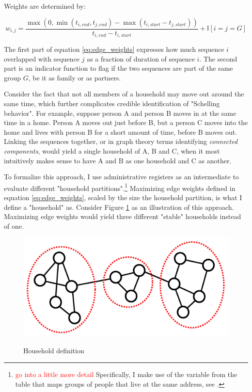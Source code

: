 \documentclass[main.tex]{subfiles}
\begin{document}
Weights are determined by:

\begin{equation}
    w_{i, j} = \frac{\max(0 , \min(t_{i,end}, t_{j, end}) -\max(t_{i,start}-t_{j, start}))}{t_{i,end}-t_{i,start}} + \mathbb{I}[i=j=G]
    \label{eq:edge_weights}
\end{equation}

The first part of equation \ref{eq:edge_weights} expresses how much sequence $i$ overlapped with sequence $j$ as a fraction of duration of sequence $i$. The second part is an indicator function to flag if the two sequences are part of the same group $G$, be it as family or as partners.

Consider the fact that not all members of a household may move out around the same time, which further complicates credible identification of "Schelling behavior". For example, suppose person A and person B moves in at the same time in a home. Person A moves out just before B, but a person C moves into the home and lives with person B for a short amount of time, before B moves out. Linking the sequences together, or in graph theory terms identifying \textit{connected components}, would yield a single household of A, B and C, when it most intuitively makes sense to have A and B as one household and C as another. 

To formalize this approach, I use administrative registers as an intermediate to evaluate different "household partitions".\footnote{\textcolor{red}{go into a little more detail} Specifically, I make use of the  variable from the  table that maps groups of people that live at the same address, see \textcite{dst_familie_id}.} Maximizing edge weights defined in equation \ref{eq:edge_weights}, scaled by the size the household partition, is what I define a "household" as. Consider Figure \ref{fig:temporal_community_detection} as an illustration of this approach. Maximizing edge weights would yield three different "stable" households instead of one.
\begin{figure}[H]
    \centering
    \caption{Household definition}
    \includegraphics[width=0.4\linewidth]{figs/temporal_community_detection.png}
    \label{fig:temporal_community_detection}
\end{figure}
\end{document}
